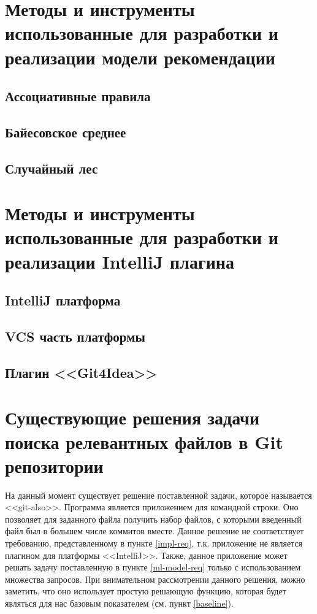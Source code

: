 \section{Методы и инструменты использованные для разработки и реализации модели рекомендации}
    \subsection{Ассоциативные правила}
    \subsection{Байесовское среднее}\label{chapter-2-bayes}
    \subsection{Случайный лес}
\section{Методы и инструменты использованные для разработки и реализации IntelliJ плагина}
    \subsection{IntelliJ платформа}
    \subsection{VCS часть платформы}
    \subsection{Плагин <<Git4Idea>>}
\section{Существующие решения задачи поиска релевантных файлов в Git репозитории}
На данный момент существует решение поставленной задачи, которое называется <<git-also>>. Программа является приложением для командной строки. Оно позволяет для заданного файла получить набор файлов, с которыми введенный файл был в большем числе коммитов вместе. Данное решение не соответствует требованию, представленному в пункте \ref{impl-req}, т.к. приложение не является плагином для платформы <<IntelliJ>>. Также, данное приложение может решать задачу поставленную в пункте \ref{ml-model-req} только с использованием множества запросов. При внимательном рассмотрении данного решения, можно заметить, что оно использует простую решающую функцию, которая будет являться для нас базовым показателем (см. пункт \ref{baseline}).
\chapterconclusion